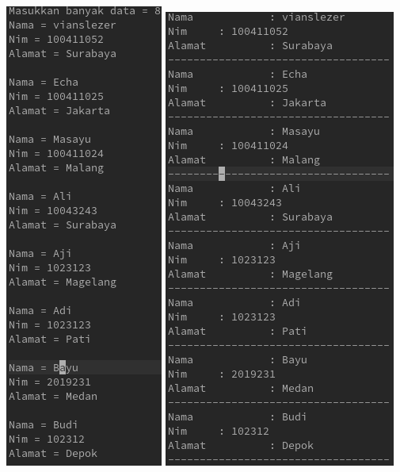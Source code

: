 \documentclass[a4paper,12pt]{article}
\begin{document}
\begin{center}
    \includegraphics[scale=.45]{5.png}
    \includegraphics[scale=.45]{5a.png}
\end{center}
\end{document}
